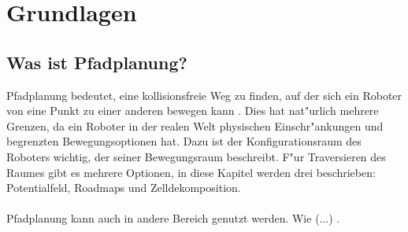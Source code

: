 \chapter{Grundlagen}

\section{Was ist Pfadplanung?}
Pfadplanung bedeutet, eine kollisionsfreie Weg zu finden, auf der sich ein Roboter von eine Punkt zu einer anderen bewegen kann \cite[~S. 1]{Principles:05}. Dies hat nat"urlich mehrere Grenzen, da ein Roboter in der realen Welt physischen Einschr"ankungen und begrenzten Bewegungsoptionen hat. Dazu ist der Konfigurationsraum des Roboters wichtig, der seiner Bewegungsraum beschreibt. F"ur Traversieren des Raumes gibt es mehrere Optionen, in diese Kapitel werden drei beschrieben: Potentialfeld, Roadmaps und Zelldekomposition.
\\\\
Pfadplanung kann auch in andere Bereich genutzt werden. Wie (...) . 

